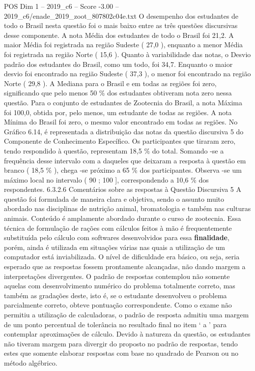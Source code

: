 \begin{textsample}{POS Dim 1 – 2019\_c6 – Score -3.00 – 2019\_c6/enade\_2019\_zoot\_807802c04e.txt}
O desempenho dos estudantes de todo o Brasil nesta questão foi o mais baixo entre as três questões discursivas desse componente.
A nota Média dos estudantes de todo o Brasil foi 21,2.
A maior Média foi registrada na região Sudeste ( 27,0 ), enquanto a menor Média foi registrada na região Norte ( 15,6 ).
Quanto à variabilidade das notas, o Desvio padrão dos estudantes do Brasil, como um todo, foi 34,7.
Enquanto o maior desvio foi encontrado na região Sudeste ( 37,3 ), o menor foi encontrado na região Norte ( 29,8 ).
A Mediana para o Brasil e em todas as regiões foi zero, significando que pelo menos 50 \% dos estudantes obtiveram nota zero nessa questão.
Para o conjunto de estudantes de Zootecnia do Brasil, a nota Máxima foi 100,0, obtida por, pelo menos, um estudante de todas as regiões.
A nota Mínima do Brasil foi zero, o mesmo valor encontrado em todas as regiões.
No Gráfico 6.14, é representada a distribuição das notas da questão discursiva 5 do Componente de Conhecimento Específico.
Os participantes que tiraram zero, tendo respondido à questão, representam 18,5 \% do total.
Somando -se a frequência desse intervalo com a daqueles que deixaram a resposta à questão em branco ( 18,5 \% ), chega -se próximo a 65 \% dos participantes.
Observa -se um máximo local no intervalo ( 90 ; 100 ], correspondendo a 10,6 \% dos respondentes. 6.3.2.6 Comentários sobre as respostas à Questão Discursiva 5 A questão foi formulada de maneira clara e objetiva, sendo o assunto muito abordado nas disciplinas de nutrição animal, bromatologia e também nas culturas animais.
Conteúdo é amplamente abordado durante o curso de zootecnia.
Essa técnica de formulação de rações com cálculos feitos à mão é frequentemente substituída pelo cálculo com softwares desenvolvidos para essa \textbf{finalidade}, porém, ainda é utilizada em situações várias nas quais a utilização de um computador está inviabilizada.
O nível de dificuldade era básico, ou seja, seria esperado que as respostas fossem prontamente alcançadas, não dando margem a interpretações divergentes.
O padrão de respostas contemplou não somente aquelas com desenvolvimento numérico do problema totalmente correto, mas também as gradações deste, isto é, se o estudante desenvolveu o problema parcialmente correto, obteve pontuação correspondente.
Como o exame não permitiu a utilização de calculadoras, o padrão de resposta admitiu uma margem de um ponto percentual de tolerância no resultado final no item ‘ a ’ para contemplar aproximações de cálculo.
Devido à natureza da questão, os estudantes não tiveram margem para divergir do proposto no padrão de respostas, tendo estes que somente elaborar respostas com base no quadrado de Pearson ou no método algébrico.

\end{textsample}
